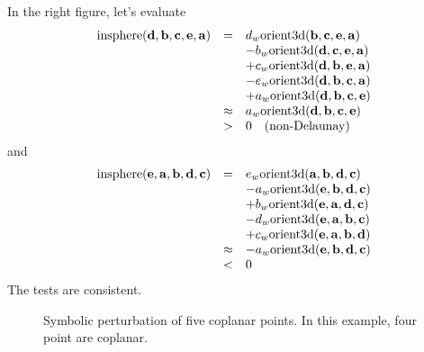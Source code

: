 In the right figure, let's evaluate 
\[
\begin{array}{rcl}
\textrm{insphere}({\bf d}, {\bf b}, {\bf c}, {\bf e}, {\bf a}) &=&
d_w\textrm{orient3d}({\bf b}, {\bf c}, {\bf e}, {\bf a})\\
& & -b_w\textrm{orient3d}({\bf d}, {\bf c}, {\bf e}, {\bf a})\\
& & +c_w\textrm{orient3d}({\bf d}, {\bf b}, {\bf e}, {\bf a})\\
& & -e_w\textrm{orient3d}({\bf d}, {\bf b}, {\bf c}, {\bf a})\\
& & +a_w\textrm{orient3d}({\bf d}, {\bf b}, {\bf c}, {\bf e})\\
&\approx& a_w\textrm{orient3d}({\bf d}, {\bf b}, {\bf c}, {\bf e})\\
&>& 0 \quad \textrm{(non-Delaunay)}
\end{array}
\]
and
\[
\begin{array}{rcl}
\textrm{insphere}({\bf e}, {\bf a}, {\bf b}, {\bf d}, {\bf c}) &=&
e_w\textrm{orient3d}({\bf a}, {\bf b}, {\bf d}, {\bf c})\\
& & -a_w\textrm{orient3d}({\bf e}, {\bf b}, {\bf d}, {\bf c})\\
& & +b_w\textrm{orient3d}({\bf e}, {\bf a}, {\bf d}, {\bf c})\\
& & -d_w\textrm{orient3d}({\bf e}, {\bf a}, {\bf b}, {\bf c})\\
& & +c_w\textrm{orient3d}({\bf e}, {\bf a}, {\bf b}, {\bf d})\\
&\approx& -a_w\textrm{orient3d}({\bf e}, {\bf b}, {\bf d}, {\bf c})\\
&<& 0
\end{array}
\]
The tests are consistent.

\begin{figure}
\caption{Symbolic perturbation of five coplanar points. In this example, four point are coplanar.}
\label{fig:ex2}
\end{figure}

